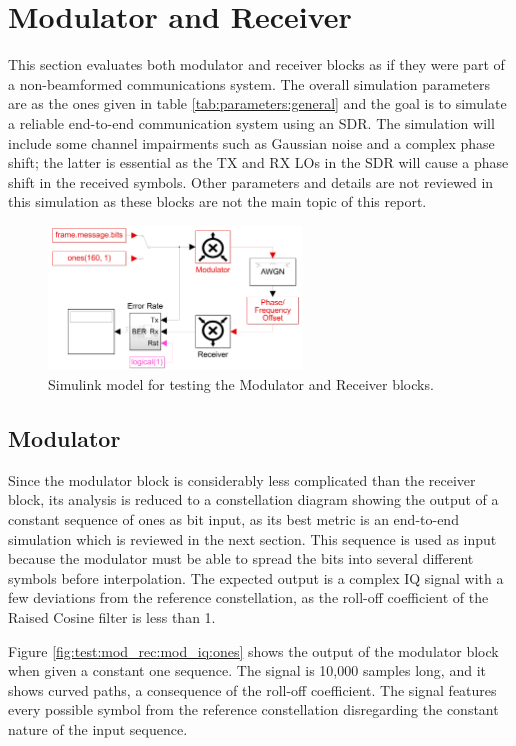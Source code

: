 \documentclass[12pt,a4paper]{report}
\begin{document}
\section{Modulator and Receiver} \label{test:mod_rec}
This section evaluates both modulator and receiver blocks as if they were part of a non-beamformed communications system. The overall simulation parameters are as the ones given in table \ref{tab:parameters:general} and the goal is to simulate a reliable end-to-end communication system using an SDR. The simulation will include some channel impairments such as Gaussian noise and a complex phase shift; the latter is essential as the TX and RX LOs in the SDR will cause a phase shift in the received symbols. Other parameters and details are not reviewed in this simulation as these blocks are not the main topic of this report. 

\begin{figure}[h]
    \centering
    \includegraphics[width = 0.6\textwidth]{Figures/test_mod_rec.png}
    \caption{Simulink model for testing the Modulator and Receiver blocks.}
    \label{fig:test:mod_rec}
\end{figure}

\subsection{Modulator} \label{test:mod_rec:mod}
Since the modulator block is considerably less complicated than the receiver block, its analysis is reduced to a constellation diagram showing the output of a constant sequence of ones as bit input, as its best metric is an end-to-end simulation which is reviewed in the next section. This sequence is used as input because the modulator must be able to spread the bits into several different symbols before interpolation. The expected output is a complex IQ signal with a few deviations from the reference constellation, as the roll-off coefficient of the Raised Cosine filter is less than 1.

Figure \ref{fig:test:mod_rec:mod_iq:ones} shows the output of the modulator block when given a constant one sequence. The signal is 10,000 samples long, and it shows curved paths, a consequence of the roll-off coefficient. The signal features every possible symbol from the reference constellation disregarding the constant nature of the input sequence. 
\end{document}
